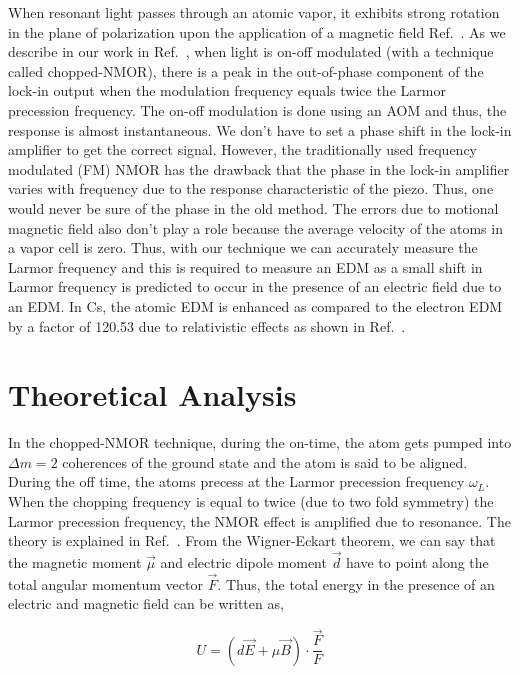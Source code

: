 When resonant light passes through an atomic vapor, it exhibits strong rotation in the plane of polarization upon the application of a magnetic field Ref.\ \cite{BGK02}. As we describe in our work in Ref.\ \cite{RCN11}, when light is on-off modulated (with a technique called chopped-NMOR), there is a peak in the out-of-phase component of the lock-in output when the modulation frequency equals twice the Larmor precession frequency. The on-off modulation is done using an AOM and thus, the response is almost instantaneous. We don't have to set a phase shift in the lock-in amplifier to get the correct signal. However, the traditionally used frequency modulated (FM) NMOR has the drawback that the phase in the lock-in amplifier varies with frequency due to the response characteristic of the piezo. Thus, one would never be sure of the phase in the old method. The errors due to motional magnetic field also don't play a role because the average velocity of the atoms in a vapor cell is zero. Thus, with our technique we can accurately measure the Larmor frequency and this is required to measure an EDM as a small shift in Larmor frequency is predicted to occur in the presence of an electric field due to an EDM. In Cs, the atomic EDM is enhanced as compared to the electron EDM by a factor of 120.53 due to relativistic effects as shown in Ref.\ \cite{NSD08}.

\section{Theoretical Analysis}

In the chopped-NMOR technique, during the on-time, the atom gets pumped into $\Delta m =2$ coherences of the ground state and the atom is said to be aligned. During the off time, the atoms precess at the Larmor precession frequency $\omega_L$. When the chopping frequency is equal to twice (due to two fold symmetry) the Larmor precession frequency, the NMOR effect is amplified due to resonance. The theory is explained in Ref.\ \cite{RCN11}. From the Wigner-Eckart theorem, we can say that the magnetic moment $\vec{\mu}$ and electric dipole moment $\vec{d}$ have to point along the total angular momentum vector $\vec{F}$. Thus, the total energy in the presence of an electric and magnetic field can be written as,

\begin{equation}
U = \left(d\vec{E} + \mu \vec{B}\right) \cdot \frac{\vec{F}}{F}
\end{equation}

